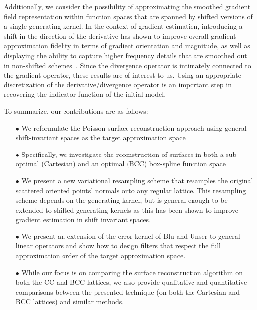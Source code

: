 Additionally, we consider the possibility of approximating the smoothed gradient field representation within function spaces that are
spanned by shifted versions of a single generating kernel. In the context of gradient estimation, introducing a shift in the direction
of the derivative has shown to improve overall gradient approximation fidelity in terms of gradient orientation and magnitude,
as well as displaying the ability to capture higher frequency details that are smoothed out in non-shifted schemes~\cite{gradrev}. Since the divergence operator is intimately connected to the gradient operator, these results are of interest to us. Using an appropriate discretization of the derivative/divergence operator is an important step in recovering the indicator function of the initial model. 

To summarize, our contributions are as follows:
\begin{itemize}
\item[$\bullet$] We reformulate the Poisson surface reconstruction approach using general shift-invariant spaces as the target approximation space
\item[$\bullet$] Specifically, we investigate the reconstruction of surfaces in both a sub-optimal (Cartesian) and an optimal (BCC)
  box-spline function space
\item[$\bullet$] We present a new variational resampling scheme that resamples the original scattered oriented points' normals onto any regular lattice. This resampling scheme depends on the generating kernel, but is general enough to be extended to shifted generating kernels as this has been shown to improve gradient estimation in shift invariant spaces. 
\item[$\bullet$] We present an extension of the error kernel of Blu and Unser to general linear operators and show how to design filters that respect the full approximation order of the target approximation space.
\item[$\bullet$] While our focus is on comparing the surface reconstruction algorithm on both the CC and BCC lattices, we also provide qualitative and quantitative comparisons between the presented technique (on both the Cartesian and BCC lattices) and similar methods. 
\end{itemize}


